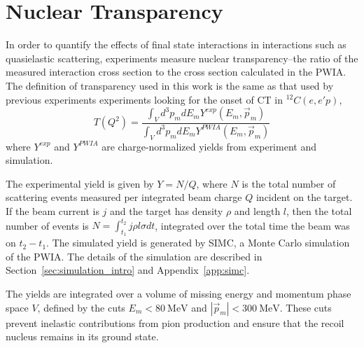 \section{Nuclear Transparency}
In order to quantify the effects of final state interactions in interactions
such as quasielastic scattering, experiments measure nuclear transparency--the
ratio of
the measured interaction cross section
to
the cross section calculated in the PWIA.
The definition of transparency used in this work is the same as that used by
previous experiments experiments looking for the onset of CT in
${}^{12}C(e,e'p)$,
\begin{equation} \label{eqn:transparency_definition}
    T(Q^2) = \frac{\int_{V} d^{3} p_{m} d E_{m} Y^{exp }(E_{m}, \vec{p}_{m})}
                  {\int_{V} d^{3} p_{m} d E_{m} Y^{PWIA}(E_{m}, \vec{p}_{m})}
\end{equation}
where $Y^{exp}$ and $Y^{PWIA}$ are charge-normalized yields from experiment and
simulation.

The experimental yield is given by $Y=N/Q$, where $N$ is the total number of
scattering events measured per integrated beam charge $Q$ incident on the
target.
If the beam current is $j$ and the target has density $\rho$ and length $l$,
then the total number of events is $N=\int_{t_1}^{t_2} j \rho l \sigma dt$,
integrated over the total time the beam was on $t_2-t_1$.
The simulated yield is generated by SIMC, a Monte Carlo simulation of the PWIA.
The details of the simulation are described in
Section~\ref{sec:simulation_intro} and Appendix~\ref{app:simc}.

The yields are integrated over a volume of missing energy and momentum phase
space $V$, defined by the cuts $E_m < \SI{80}{\mega\electronvolt}$ and
$|\vec{p}_m| < \SI{300}{\mega\electronvolt}$.
These cuts prevent inelastic contributions from pion production and ensure that
the recoil nucleus remains in its ground state.
